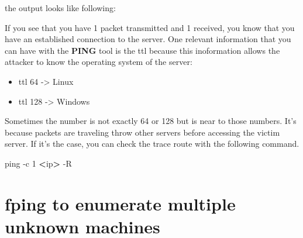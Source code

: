 \documentclass{assets/ipesethesis}
\newenvironment{Shaded}{\begin{snugshade}}{\end{snugshade}}
\newcommand{\CommentTok}[1]{\textcolor[rgb]{0.56,0.35,0.01}{\textit{#1}}}
\newcommand{\ExtensionTok}[1]{#1}
\newcommand{\FunctionTok}[1]{\textcolor[rgb]{0.00,0.00,0.00}{#1}}
\newcommand{\NormalTok}[1]{#1}
\newcommand{\OperatorTok}[1]{\textcolor[rgb]{0.81,0.36,0.00}{\textbf{#1}}}
\providecommand{\tightlist}{%
  \setlength{\itemsep}{0pt}\setlength{\parskip}{0pt}}
\begin{document}
the output looks like following:

\begin{Shaded}
\end{Shaded}

If you see that you have 1 packet transmitted and 1 received, you know that you have an established connection to the server.
One relevant information that you can have with the \textbf{PING} tool is the ttl because this inoformation allows the attacker to
know the operating system of the server:

\begin{itemize}
\tightlist
\item
  ttl 64 -\textgreater{} Linux
\item
  ttl 128 -\textgreater{} Windows
\end{itemize}

Sometimes the number is not exactly 64 or 128 but is near to those numbers. It's because packets are traveling throw other servers
before accessing the victim server. If it's the case, you can check the trace route with the following command.

\begin{Shaded}
\begin{Highlighting}[]
\FunctionTok{ping}\NormalTok{ -c 1 }\OperatorTok{<}\NormalTok{ip}\OperatorTok{>}\NormalTok{ -R}
\end{Highlighting}
\end{Shaded}

\hypertarget{fping-to-enumerate-multiple-unknown-machines}{%
\section*{fping to enumerate multiple unknown machines}\label{fping-to-enumerate-multiple-unknown-machines}}
\end{document}
